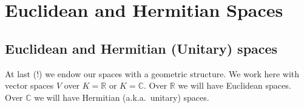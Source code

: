 \renewcommand{\thetheorem}{22.a.\arabic{theorem}}
\setcounter{theorem}{0}
\setcounter{chapter}{21}

\chapter{Euclidean and Hermitian Spaces}

\section{Euclidean and Hermitian (Unitary) spaces}

At last (!) we endow our spaces with a geometric structure. We work here with vector spaces $V$ over $K = \mathbb{R}$ or $K = \mathbb{C}$. Over $\mathbb{R}$ we will have Euclidean spaces. Over $\mathbb{C}$ we will have Hermitian (a.k.a.\ unitary) spaces.

